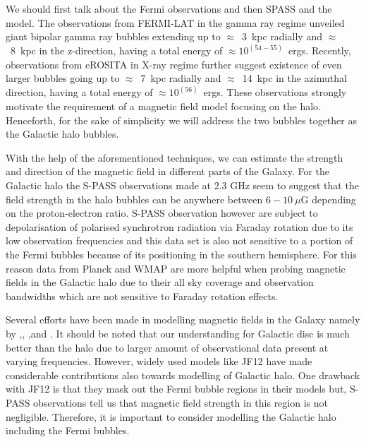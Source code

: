 \documentclass[12pt, a4 paper]{article}
\newcommand{\Vasu}[1]{{\color{purple}#1}}
\begin{document}
\Vasu{We should first talk about the Fermi observations and then SPASS and the model.}
The observations from FERMI-LAT \cite{Su_2010} in the gamma ray regime unveiled giant bipolar gamma ray bubbles extending up to $\approx$~3~kpc radially and $\approx$~8~kpc in the z-direction, having a total energy of $\approx 10^{(54-55)}$~ergs. Recently, observations from eROSITA \cite{eROSITA} in X-ray regime further suggest existence of even larger bubbles going up to  $\approx$~7~kpc radially and $\approx$~14~kpc in the azimuthal direction, having a total energy of $\approx 10^{(56)}$~ergs. These observations strongly motivate the requirement of a magnetic field model focusing on the halo. Henceforth, for the sake of simplicity we will address the two bubbles together as the Galactic halo bubbles.

With the help of the aforementioned techniques, we can estimate the strength and direction of the magnetic field in different parts of the Galaxy. 
For the Galactic halo the S-PASS \cite{Carretti_2013} observations  made at 2.3 GHz seem to suggest that the field strength in the halo bubbles can be anywhere between $6-10~\mu $G depending on the proton-electron ratio. S-PASS \cite{Carretti_2013} observation however are subject to depolarisation of polarised synchrotron radiation via Faraday rotation due to its low observation frequencies and this data set is also not sensitive to a portion of the Fermi bubbles because of its positioning in the southern hemisphere. For this reason data from Planck and WMAP are more helpful when probing magnetic fields in the Galactic halo due to their all sky coverage and observation bandwidths which are not sensitive to Faraday rotation effects.


Several efforts have  been made in modelling magnetic fields in the Galaxy namely by \cite{Jaffe_2010},\cite{Jaffe_2011}, \cite{Sun_2008},and \cite{JF12}. It should be noted that our understanding for Galactic disc is much better than the halo due to larger amount of observational data present at varying frequencies. However, widely used models like JF12 \cite{JF12} have made considerable contributions also towards modelling of Galactic halo. One drawback with JF12 \cite{JF12} is that they mask out the Fermi bubble regions in their models but, S-PASS\cite{Carretti_2013} observations tell us that magnetic field strength in this region is not negligible. Therefore, it is important to consider modelling the Galactic halo including the Fermi bubbles.
\end{document}
